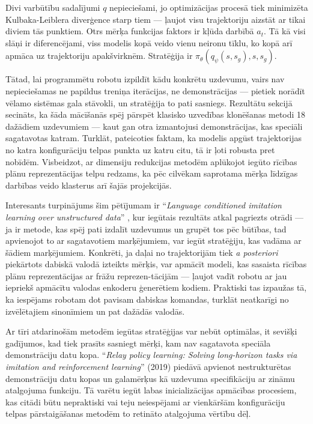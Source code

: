 \documentclass[12pt, a4paper]{article}
\numberwithin{equation}{section} %
\begin{document}
Divi varbūtību sadalījumi $q$ nepieciešami, jo optimizācijas procesā tiek minimizēta Kulbaka-Leiblera diverģence starp tiem --- ļaujot visu trajektoriju aizstāt ar tikai diviem tās punktiem. Otrs mērķa funkcijas faktors ir kļūda darbībā $a_t$. Tā kā visi slāņi ir diferencējami, viss modelis kopā veido vienu neironu tīklu, ko kopā arī apmāca uz trajektoriju apakšvirknēm. Stratēģija ir $\pi_{\theta}(q_{\psi}(s, s_g), s, s_g)$.

Tātad, lai programmētu robotu izpildīt kādu konkrētu uzdevumu, vairs nav nepieciešamas ne papildus treniņa iterācijas, ne demonstrācijas --- pietiek norādīt vēlamo sistēmas gala stāvokli, un stratēģija to pati sasniegs. Rezultātu sekcijā secināts, ka šāda mācīšanās spēj pārspēt klasisko uzvedības klonēšanas metodi 18 dažādiem uzdevumiem --- kaut gan otra izmantojusi demonstrācijas, kas speciāli sagatavotas katram. Turklāt, pateicoties faktam, ka modelis apgūst trajektorijas no katra konfigurāciju telpas punkta uz katru citu, tā ir ļoti robusta pret nobīdēm. Visbeidzot, ar dimensiju redukcijas metodēm aplūkojot iegūto rīcības plānu reprezentācijas telpu redzams, ka pēc cilvēkam saprotama mērķa līdzīgas darbības veido klasterus arī šajās projekcijās.

Interesants turpinājums šim pētījumam ir ``\textit{Language conditioned imitation learning over unstructured data}'' \cite{lynch2021language}, kur iegūtais rezultāts atkal pagriezts otrādi --- ja ir metode, kas spēj pati izdalīt uzdevumus un grupēt tos pēc būtības, tad apvienojot to ar sagatavotiem marķējumiem, var iegūt stratēģiju, kas vadāma ar šādiem marķējumiem. Konkrēti, ja daļai no trajektorijām tiek \textit{a posteriori} piekārtots dabiskā valodā izteikts mērķis, var apmācīt modeli, kas sasaista rīcības plānu reprezentācijas ar frāžu reprezen-tācijām --- ļaujot vadīt robotu ar jau iepriekš apmācītu valodas enkoderu ģenerētiem kodiem. Praktiski tas izpaužas tā, ka iespējams robotam dot pavisam dabiskas komandas, turklāt neatkarīgi no izvēlētajiem sinonīmiem un pat dažādās valodās.

Ar tīri atdarinošām metodēm iegūtas stratēģijas var nebūt optimālas, it sevišķi gadījumos, kad tiek prasīts sasniegt mērķi, kam nav sagatavota speciāla demonstrāciju datu kopa. ``\textit{Relay policy learning: Solving long-horizon tasks via imitation and reinforcement learning}'' \cite{gupta2019relay} (2019) piedāvā apvienot nestrukturētas demonstrāciju datu kopas un galamērķus kā uzdevuma specifikāciju ar zināmu atalgojuma funkciju. Tā varētu iegūt labas inicializācijas apmācības procesiem, kas citādi būtu nepraktiski vai teju neiespējami ar vienkāršām konfigurāciju telpas pārstaigāšanas metodēm to retināto atalgojuma vērtību dēļ.
\end{document}
